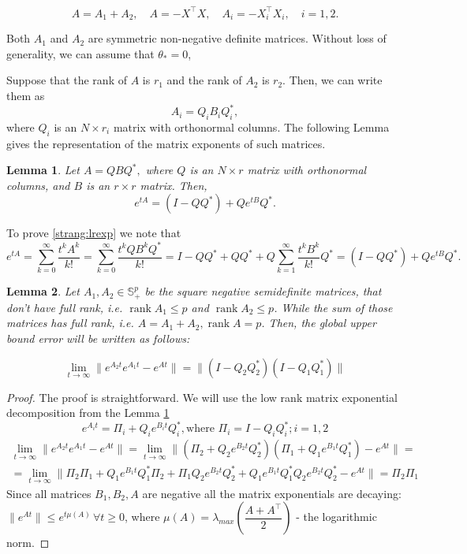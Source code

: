 \documentclass{article} %
\newtheorem{lemma}{Lemma}
\begin{document}
$$
A = A_1 + A_2, \quad A = -X^{\top} X, \quad A_i = -X^{\top}_i X_i, \quad i = 1, 2.
$$

Both $A_1$ and $A_2$ are symmetric non-negative definite matrices. Without loss of generality, we can assume that $\theta_* = 0$,

Suppose that the rank of $A$ is $r_1$ and the rank of $A_2$ is $r_2$. Then, we can write them as
$$
A_i = Q_i B_i Q^*_i,
$$
where $Q_i$ is an $N \times r_i$ matrix with orthonormal columns.  The following Lemma gives the representation of the matrix exponents of such matrices.
\begin{lemma}\label{strang:lemexp}
Let $A = Q B Q^*,$ where $Q$ is an $N \times r$ matrix with orthonormal columns, and $B$ is an $r \times r$ matrix. Then,
\begin{equation}\label{strang:lrexp}
    e^{t A}  = (I - QQ^*) + Q e^{t B} Q^*.
\end{equation}
\end{lemma}
To prove \eqref{strang:lrexp} we note that
$$e^{t A} = \sum_{k=0}^{\infty} \frac{t^k A^k}{k!} = \sum_{k=0}^{\infty} \frac{t^k Q B^k Q^*}{k!} =
I - QQ^* + QQ^* + Q \sum_{k=1}^{\infty} \frac{t^k B^k}{k!} Q^* = (I - QQ^*) + Q e^{t B} Q^*.
$$

\begin{lemma}
	\label{strang:lemupper_2}
	Let $A_1, A_2 \in \mathbb{S}^p_{+}$ be the square negative semidefinite matrices, that don't have full rank, i.e. $\operatorname{rank}{A_1} \leq p$ and $\operatorname{rank}{A_2} \leq p$. While the sum of those matrices has full rank, i.e. $A = A_1 + A_2, \operatorname{rank}{A} = p$. Then, the global upper bound error will be written as follows:

	\begin{equation}\label{strang:lemupper}
		\lim_{t \to \infty}\| e^{A_2t}e^{A_1t} - e^{At}\| = \|(I - Q_2Q_2^*)(I - Q_1Q_1^*)\|
	\end{equation}
\end{lemma}
\begin{proof}
	The proof is straightforward. We will use the low rank matrix exponential decomposition from the Lemma \ref{strang:lemexp}
	$$
	e^{A_it} = \Pi_i + Q_i e^{B_it} Q_i^*, \text{where } \Pi_i = I - Q_iQ_i^*; i = 1,2
	$$
	\begin{align*}
	\lim_{t \to \infty}\| e^{A_2t}e^{A_1t} - e^{At}\| = \lim_{t \to \infty}\| (\Pi_2 + Q_2 e^{B_2t} Q_2^*)(\Pi_1 + Q_1 e^{B_1t} Q_1^*) - e^{At}\| = \\
	= \lim_{t \to \infty}\| \Pi_2\Pi_1 + Q_1 e^{B_1t} Q_1^*\Pi_2 + \Pi_1Q_2 e^{B_2t} Q_2^* +  Q_1 e^{B_1t} Q_1^* Q_2 e^{B_2t} Q_2^* - e^{At}\| = \Pi_2 \Pi_1
	\end{align*}
	Since all matrices $B_1, B_2, A$ are negative all the matrix exponentials are decaying: $\|e^{At}\|\leq e^{t\mu (A)}\, \forall t\geq 0$, where $\mu(A) = \lambda_{max} \left( \dfrac{A + A^\top}{2}\right)$ - the logarithmic norm.
\end{proof}
\end{document}
